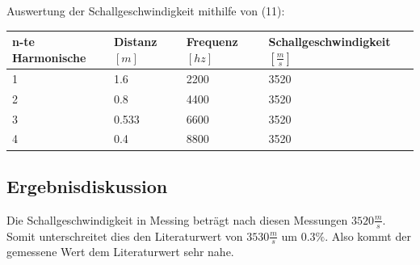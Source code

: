\documentclass{scrartcl}
\begin{document}
\begin{table}[h]
Auswertung der Schallgeschwindigkeit mithilfe von (11):
\begin{tabular}{l|l|l|l}
n-te Harmonische &	Distanz $[m]$ & Frequenz $[hz]$&Schallgeschwindigkeit $[\frac{m}{s}]$\\ \hline
1			&	1.6		&	2200	&	 3520\\
2			&	0.8		&	4400	&	 3520\\
3			&	0.533	& 	6600	&	3520\\
4			&	0.4		& 	8800	&	3520\\

\end{tabular}
\end{table}
\subsection{Ergebnisdiskussion}
Die Schallgeschwindigkeit in Messing beträgt nach diesen Messungen $3520\frac{m}{s}$. Somit unterschreitet dies den Literaturwert von $3530\frac{m}{s}$ um $0.3\%$. Also kommt der gemessene Wert dem Literaturwert sehr nahe.
\end{document}
